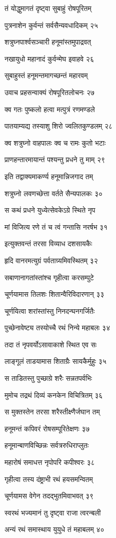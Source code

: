 तं योद्धुमागतं दृष्ट्वा सुबाहुं रोषपूरितम्

पुत्रनाशेन कुर्वन्तं सर्वसैन्यवधादिकम् २५

शत्रुघ्नपार्श्वसञ्चारी हनूमांस्तमुपाद्रवत्

नखायुधो महानादं कुर्वन्मेघ इवाहवे २६

सुबाहुस्तं हनूमन्तमागच्छन्तं महारवम्

उवाच प्रहसन्वाक्यं रोषपूरितलोचनः २७

क्व गतः पुष्कलो हत्वा मत्पुत्रं रणमण्डले

पातयाम्यद्य तस्याशु शिरो ज्वलितकुण्डलम् २८

क्व शत्रुघ्नो वाहपालः क्व च रामः कुतो भटाः

प्राणहन्तारमायान्तं पश्यन्तु प्रधने तु माम् २९

इति तद्वाक्यमाकर्ण्य हनूमान्निजगाद तम्

शत्रुघ्नो लवणच्छेत्ता वर्तते सैन्यपालकः ३०

स कथं प्रधने युध्येत्सेवकेऽग्रे स्थिते नृप

मां विजित्य रणे तं च त्वं गन्तासि नरर्षभ ३१

इत्युक्तवन्तं तरसा विव्याध दशसायकैः

हृदि वानरमत्युग्रं पर्वताग्र्यमिवस्थितम् ३२

सबाणानागतांस्तांश्च गृहीत्वा करसम्पुटे

चूर्णयामास तिलशः शितान्वैरिविदारणान् ३३

चूर्णयित्वा शरांस्तांस्तु निनदन्घनगर्जितैः

पुच्छेनावेष्ट्य तस्योच्चै रथं निन्ये महाबलः ३४

तदा तं नृपवर्योऽसावाकाशे स्थित एव सः

लाङ्गूलं ताडयामास शिताग्रैः सायकैर्मुहुः ३५

स ताडितस्तु पुच्छाग्रे शरैः सन्नतपर्वभिः

मुमोच तद्रथं दिव्यं कनकेन विचित्रितम् ३६

स मुक्तस्तेन तरसा शरैस्तीक्ष्णैर्जघान तम्

हनूमन्तं कपिवरं रोषसम्पूरितेक्षणः ३७

हनूमान्बाणविच्छिन्नः सर्वत्ररुधिराप्लुतः

महारोषं समाधत्त नृपोपरि कपीश्वरः ३८

गृहीत्वा तस्य दंष्ट्राभी रथं हयसमन्वितम्

चूर्णयामस वेगेन तदद्भुतमिवाभवत् ३९

स्वरथं भज्यमानं तु दृष्ट्वा राजा त्वरन्बली

अन्यं रथं समास्थाय युयुधे तं महाबलम् ४०

